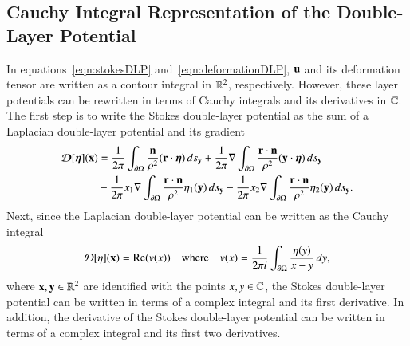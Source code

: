\documentclass[preprint, 10pt]{elsarticle}
\begin{document}
\subsection{Cauchy Integral Representation of the Double-Layer
Potential}
\label{s:DLPcomplex}
In equations~\eqref{eqn:stokesDLP} and~\eqref{eqn:deformationDLP}, ${\mathbf{u}}$
and its deformation tensor are written as a contour integral in ${\mathbb{R}}^2$,
respectively.  However, these layer potentials can be rewritten in terms
of Cauchy integrals and its derivatives in ${\mathbb{C}}$.  The first step is to
write the Stokes double-layer potential as the sum of a Laplacian
double-layer potential and its gradient
\begin{equation}
  \label{eqn:Stokes2Laplace}
  \begin{aligned}
    {\boldsymbol{\mathcal D}}[{\boldsymbol\eta}]({\mathbf{x}}) &= 
      \frac{1}{2\pi} \int_{{\partial}\Omega} 
        \frac{{\mathbf{n}}}{\rho^2} ({\mathbf{r}} \cdot {\boldsymbol\eta}) \, ds_{\mathbf{y}} + 
      \frac{1}{2\pi} \nabla \int_{{\partial}\Omega}
        \frac{{\mathbf{r}} \cdot {\mathbf{n}}}{\rho^2} ({\mathbf{y}} \cdot {\boldsymbol\eta}) \, ds_{\mathbf{y}} \\
      &- \frac{1}{2\pi} x_1 \nabla \int_{{\partial}\Omega}
        \frac{{\mathbf{r}} \cdot {\mathbf{n}}}{\rho^2}\eta_1({\mathbf{y}}) \, ds_{\mathbf{y}} -
      \frac{1}{2\pi} x_2 \nabla \int_{{\partial}\Omega}
        \frac{{\mathbf{r}} \cdot {\mathbf{n}}}{\rho^2}\eta_2({\mathbf{y}}) \, ds_{\mathbf{y}}.
  \end{aligned}
\end{equation}
Next, since the Laplacian double-layer potential can be written as the
Cauchy integral
\begin{align}
  {\mathcal{D}}[\eta]({\mathbf{x}}) = {\operatorname{Re}} (v(x)) \quad \text{where} \quad
  v(x) = \frac{1}{2\pi i} \int_{{\partial}\Omega}
    \frac{\eta(y)}{x - y} \, dy,
  \label{eqn:laplaceComplex}
\end{align}
where ${\mathbf{x}},{\mathbf{y}} \in {\mathbb{R}}^2$ are identified with the points $x,y \in {\mathbb{C}}$,
the Stokes double-layer potential can be written in terms of a complex
integral and its first derivative.  In addition, the derivative of the
Stokes double-layer potential can be written in terms of a complex
integral and its first two derivatives.
\end{document}
